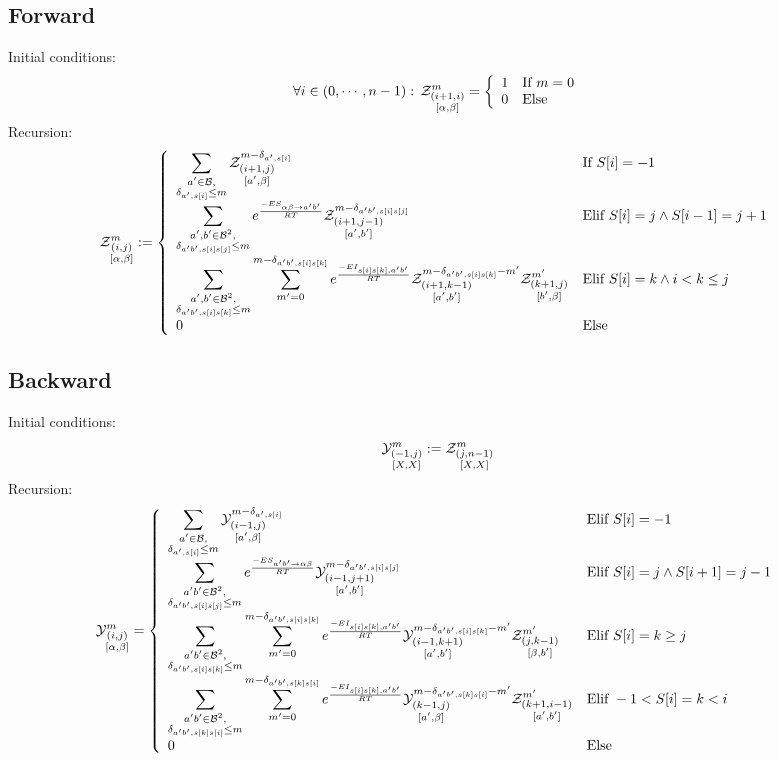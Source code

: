 \documentclass[11pt]{article} %
\begin{document}
\subsection{Forward}
Initial conditions:
$$
	\forall i \in (0,\cdots,n-1):\, \Z{i+1,i}{m}{\alpha,\beta}=\left\{
	\begin{array}{ll}
		1 &\text{If } m = 0\\
		0 &\text{Else }
	\end{array}\right.
$$
Recursion:
$$
	\Z{i,j}{m}{\alpha,\beta}:=\left\{
  \begin{array}{ll}
  		\displaystyle
      \sum_{\substack{a'\in \B,\\ \Kron_{a',s[i]}\le m}}  
      \Z{i+1,j}{m-\Kron_{a',s[i]}}{a',\beta} & \text{If }S{[i]}=-1\\
      \displaystyle
      \sum_{\substack{a',b'\in \B^2,\\ \Kron_{a'b',s[i]s[j]}\le m}}  
			 e^{\frac{-ES_{\alpha \beta \to a' b'}}{RT}}
			 \Z{i+1,j-1}{m-\Kron_{a'b',s[i]s[j]}}{a',b'}&
			 \text{Elif }S{[i]}=j \land S{[i-1]}=j+1\\
			 \displaystyle
      \sum_{\substack{a',b'\in \B^2,\\ \Kron_{a'b',s[i]s[k]}\le m}}
      \sum_{m'=0}^{m-\Kron_{a'b',s[i]s[k]}}
   		 e^{\frac{-EI_{s[i]s[k],a'b'}}{RT}}
      \Z{i+1,k-1}{m-\Kron_{a'b',s[i]s[k]}-m'}{a',b'}
      \Z{k+1,j}{m'}{b',\beta} & \text{Elif }S[i]=k \land i < k \leq j\\
      0 &\text{Else}
	\end{array}\right.
$$

\subsection{Backward}	
Initial conditions:
$$
	\Y{-1,j}{m}{X,X}:=
		\displaystyle
	  \Z{j,n-1}{m}{X,X}
$$
Recursion:
$$
	\Y{i,j}{m}{\alpha,\beta} = \left\{
  \begin{array}{ll}
		\displaystyle
    \sum_{\substack{a'\in \B,\\ \Kron_{a',s[i]}\le m}}
    \Y{i-1,j}{m- \Kron_{a',s[i]}}{a',\beta} &
    \text{Elif }S[i]=-1 \\
    \displaystyle
    \sum_{\substack{a'b'\in \B^2,\\ \Kron_{a'b',s[i]s[j]}\le m}}
		 e^{\frac{-ES_{ a' b' \to \alpha \beta }}{RT}}
    \Y{i-1,j+1}{m- \Kron_{a'b',s[i]s[j]}}{a',b'} &
   	 \text{Elif }S{[i]}=j \land S{[i+1]}=j-1\\
		 \displaystyle
		 \sum_{\substack{a'b'\in \B^2,\\ \Kron_{a'b',s[i]s[k]}\le m}}
		 \sum_{m'=0}^{m-\Kron_{a'b',s[i]s[k]}}
  		 e^{\frac{-EI_{s[i]s[k],a'b'}}{RT}}
		 \Y{i-1,k+1}{m- \Kron_{a'b',s[i]s[k]} - m'}{a',b'}
     \Z{j,k-1}{m'}{\beta,b'} &
		 \text{Elif }S{[i]}=k \geq j\\
		 \displaystyle
		 \sum_{\substack{a'b'\in \B^2,\\ \Kron_{a'b',s[k]s[i]}\le m}}
		 \sum_{m'=0}^{m-\Kron_{a'b',s[k]s[i]}}
  		 e^{\frac{-EI_{s[i]s[k],a'b'}}{RT}}
		 \Y{k-1,j}{m- \Kron_{a'b',s[k]s[i]} - m'}{a',\beta}
     \Z{k+1,i-1}{m'}{a',b'} &
		 \text{Elif }-1 < S{[i]}=k < i\\
		 0 & \text{Else}
  \end{array}\right.
$$
\end{document}
